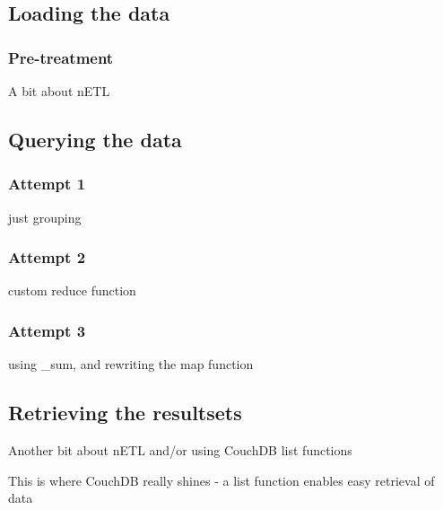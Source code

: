 \subsection{Loading the data}
\subsubsection*{Pre-treatment}
A bit about nETL

\subsection{Querying the data}
\subsubsection*{Attempt 1}
just grouping

\subsubsection*{Attempt 2}
custom reduce function

\subsubsection*{Attempt 3}
using \_sum, and rewriting the map function

\subsection{Retrieving the resultsets}
Another bit about nETL and/or using CouchDB list functions

This is where CouchDB really shines - a list function enables easy retrieval of data